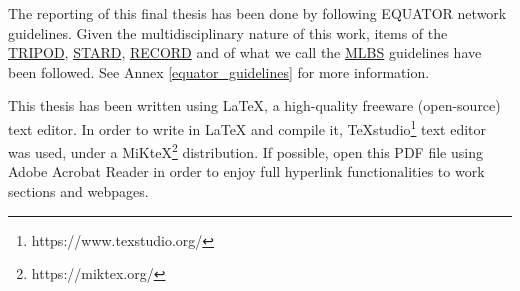 \documentclass[a4paper,12pt]{elsarticle}  %
\begin{document}
\begin{titlepage}
	\thispagestyle{empty}
	
	\pagebreak
	\hspace{0pt}
	\vfill
	The reporting of this final thesis has been done by following EQUATOR network guidelines. Given the multidisciplinary nature of this work, items of the \href{http://www.equator-network.org/reporting-guidelines/tripod-statement/}{TRIPOD}, \href{http://www.equator-network.org/reporting-guidelines/stard/}{STARD}, 	\href{http://www.equator-network.org}{RECORD} and of what we call the	\href{http://www.equator-network.org/reporting-guidelines/guidelines-for-developing-and-reporting-machine-learning-predictive-models-in-biomedical-research-a-multidisciplinary-view/}{MLBS} guidelines have been followed. See Annex \ref{equator_guidelines} for more information. 
	
	This thesis has been written using LaTeX, a high-quality freeware (open-source) text editor. In order to write in LaTeX and compile it, TeXstudio\footnote{https://www.texstudio.org/} text editor was used, under a MiKteX\footnote{https://miktex.org/} distribution. If possible, open this PDF file using Adobe Acrobat Reader in order to enjoy full hyperlink functionalities to work sections and webpages.
	
	\vfill
	\hspace{0pt}
	\pagebreak	
\end{titlepage}





\clearpage


	\maketitle
	
\end{document}
